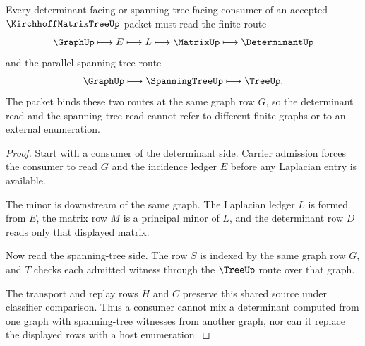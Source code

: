 \begin{theorem}
\label{thm:kirchhoff-matrix-tree-laplacian-minor-route}
Every determinant-facing or spanning-tree-facing consumer of an accepted $\KirchhoffMatrixTreeUp$ packet must read the finite route
$$
\GraphUp
\longmapsto
E
\longmapsto
L
\longmapsto
\MatrixUp
\longmapsto
\DeterminantUp
$$
and the parallel spanning-tree route
$$
\GraphUp
\longmapsto
\SpanningTreeUp
\longmapsto
\TreeUp .
$$
The packet binds these two routes at the same graph row $G$, so the determinant read and the spanning-tree read cannot refer to different finite graphs or to an external enumeration.
\end{theorem}
\begin{proof}
Start with a consumer of the determinant side. Carrier admission forces the consumer to read $G$ and the incidence ledger $E$ before any Laplacian entry is available.

The minor is downstream of the same graph. The Laplacian ledger $L$ is formed from $E$, the matrix row $M$ is a principal minor of $L$, and the determinant row $D$ reads only that displayed matrix.

Now read the spanning-tree side. The row $S$ is indexed by the same graph row $G$, and $T$ checks each admitted witness through the $\TreeUp$ route over that graph.

The transport and replay rows $H$ and $C$ preserve this shared source under classifier comparison. Thus a consumer cannot mix a determinant computed from one graph with spanning-tree witnesses from another graph, nor can it replace the displayed rows with a host enumeration.
\end{proof}



